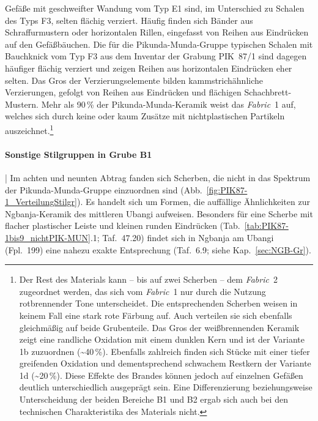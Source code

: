 Gefäße mit geschweifter Wandung vom Typ E1 sind, im Unterschied zu Schalen des Typs F3, selten flächig verziert. Häufig finden sich Bänder aus Schraffurmustern oder horizontalen Rillen, eingefasst von Reihen aus Eindrücken auf den Gefäßbäuchen. Die für die Pikunda-Munda-Gruppe typischen Schalen mit Bauchknick vom Typ F3 aus dem Inventar der Grabung PIK~87/1 sind dagegen häufiger flächig verziert und zeigen Reihen aus horizontalen Eindrücken eher selten. Das Gros der Verzierungselemente bilden kammstrichähnliche Verzierungen, gefolgt von Reihen aus Eindrücken und flächigen Schachbrett-Mustern. Mehr als 90\,\% der Pikunda-Munda-Keramik weist das \textit{Fabric}~1 auf, welches sich durch keine oder kaum Zusätze mit nichtplastischen Partikeln auszeichnet.\footnote{Der Rest des Materials kann -- bis auf zwei Scherben -- dem \textit{Fabric}~2 zugeordnet werden, das sich vom \textit{Fabric}~1 nur durch die Nutzung rotbrennender Tone unterscheidet. Die entsprechenden Scherben weisen in keinem Fall eine stark rote Färbung auf. Auch verteilen sie sich ebenfalls gleichmäßig auf beide Grubenteile. Das Gros der weißbrennenden Keramik zeigt eine randliche Oxidation mit einem dunklen Kern und ist der Variante 1b zuzuordnen (\textasciitilde40\,\%). Ebenfalls zahlreich finden sich Stücke mit einer tiefer greifenden Oxidation und dementsprechend schwachem Restkern der Variante 1d (\textasciitilde20\,\%). Diese Effekte des Brandes können jedoch auf einzelnen Gefäßen deutlich unterschiedlich ausgeprägt sein. Eine Differenzierung beziehungsweise Unterscheidung der beiden Bereiche B1 und B2 ergab sich auch bei den technischen Charakteristika des Materials nicht.}

\paragraph{Sonstige Stilgruppen in Grube B1}\hspace{-.5em}|\hspace{.5em}%
Im achten und neunten Abtrag fanden sich Scherben, die nicht in das Spektrum der Pikunda-Munda-Gruppe einzuordnen sind (Abb.~\ref{fig:PIK87-1_VerteilungStilgr}). Es handelt sich um Formen, die auffällige Ähnlichkeiten zur \mbox{Ngbanja}-Keramik des mittleren \mbox{Ubangi} aufweisen. Besonders für eine Scherbe  mit flacher plastischer Leiste und kleinen runden Eindrücken (Tab.~\ref{tab:PIK87-1bis9_nichtPIK-MUN}.1; Taf.~47.20) findet sich in \mbox{Ngbanja} am \mbox{Ubangi} (Fpl.~199) eine nahezu exakte Entsprechung (Taf.~6.9; siehe Kap.~\ref{sec:NGB-Gr}).

